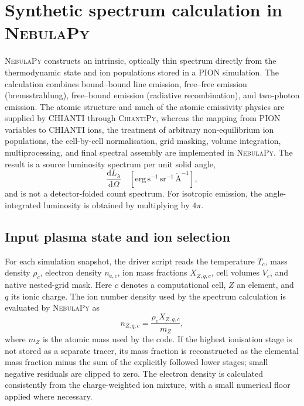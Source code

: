 \section{Synthetic spectrum calculation in \textsc{NebulaPy}}
\label{sec:nebulapy-spectrum}

\textsc{NebulaPy} constructs an intrinsic, optically thin spectrum directly from
the thermodynamic state and ion populations stored in a PION simulation.  The
calculation combines bound--bound line emission, free--free emission
(bremsstrahlung), free--bound emission (radiative recombination), and
two-photon emission.  The atomic structure and much of the atomic emissivity
physics are supplied by CHIANTI through \textsc{ChiantiPy}, whereas the mapping
from PION variables to CHIANTI ions, the treatment of arbitrary non-equilibrium
ion populations, the cell-by-cell normalisation, grid masking, volume
integration, multiprocessing, and final spectral assembly are implemented in
\textsc{NebulaPy}.  The result is a source luminosity spectrum per unit solid
angle,
\begin{equation}
  \frac{\mathrm{d}L_\lambda}{\mathrm{d}\Omega}
  \quad [\mathrm{erg\,s^{-1}\,sr^{-1}\,\mathring{A}^{-1}}] ,
\end{equation}
and is not a detector-folded count spectrum.  For isotropic emission, the
angle-integrated luminosity is obtained by multiplying by $4\pi$.

\subsection{Input plasma state and ion selection}

For each simulation snapshot, the driver script reads the temperature
$T_c$, mass density $\rho_c$, electron density $n_{\mathrm e,c}$, ion mass
fractions $X_{Z,q,c}$, cell volumes $V_c$, and native nested-grid mask.  Here
$c$ denotes a computational cell, $Z$ an element, and $q$ its ionic charge.
The ion number density used by the spectrum calculation is evaluated by
\textsc{NebulaPy} as
\begin{equation}
  n_{Z,q,c} = \frac{\rho_c X_{Z,q,c}}{m_Z},
  \label{eq:ion-number-density}
\end{equation}
where $m_Z$ is the atomic mass used by the code.  If the highest ionisation
stage is not stored as a separate tracer, its mass fraction is reconstructed
as the elemental mass fraction minus the sum of the explicitly followed lower
stages; small negative residuals are clipped to zero.  The electron density is
calculated consistently from the charge-weighted ion mixture, with a small
numerical floor applied where necessary.

